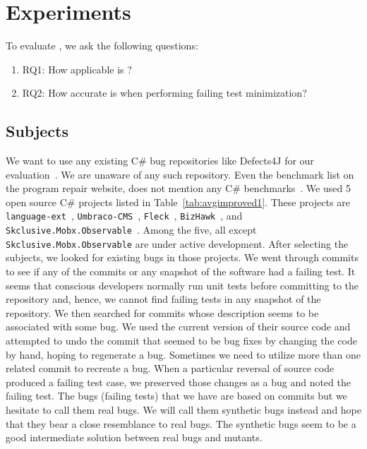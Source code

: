 \clearpage %

\chapter{Experiments}\label{CH5_Experiments}


To evaluate \mytool, we ask the following questions: 
\begin{enumerate}
    \item RQ1: How applicable is \mytool?
    \item RQ2: How accurate is \mytool when performing failing test minimization?
\end{enumerate}

\section{Subjects}
We want to use any existing C\# bug repositories like Defects4J for our evaluation~\cite{just2014defects4j}. We are unaware of any such repository. Even the benchmark list on the program repair website, does not mention any C\# benchmarks~\cite{aprbenchmarks}. We used 5 open source C\# projects listed in Table~\ref{tab:avgimproved1}. These projects are \texttt{language-ext}~\cite{louth}, \texttt{Umbraco-CMS}~\cite{deminick}, \texttt{Fleck}~\cite{staten}, \texttt{BizHawk}~\cite{adelikat}, and \texttt{Skclusive.Mobx.Observable}~\cite{skclusive}. Among the five, all except \texttt{Skclusive.Mobx.Observable} are under active development.   
After selecting the subjects, we looked for existing bugs in those projects. We went through commits to see if any of the commits or any snapshot of the software had a failing test. It seems that conscious developers normally run unit tests before committing to the repository and, hence, we cannot find failing tests in any snapshot of the repository. We then searched for commits whose description seems to be associated with some bug. We used the current version of their source code and attempted to undo the commit that seemed to be bug fixes by changing the code by hand, hoping to regenerate a bug. Sometimes we need to utilize more than one related commit to recreate a bug. When a particular reversal of source code produced a failing test case, we preserved those changes as a bug and noted the failing test. The bugs (failing tests) that we have are based on commits but we hesitate to call them real bugs. We will call them synthetic bugs instead and hope that they bear a close resemblance to real bugs. The synthetic bugs seem to be a good intermediate solution between real bugs and mutants. 

